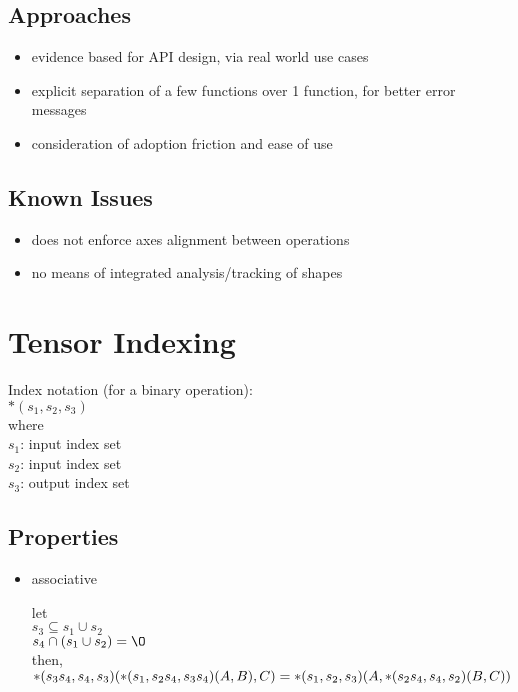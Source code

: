 \documentclass[8pt]{extarticle}
\begin{document}
\begin{multicols*}{2}
  \subsection{Approaches}
  
  \begin{itemize}
  \item evidence based for API design, via real world use cases
  \item explicit separation of a few functions over 1 function, for better error messages
  \item consideration of adoption friction and ease of use
  \end{itemize}

  \vfill\null
  \columnbreak
    
  \subsection{Known Issues}
  \begin{itemize}
  \item does not enforce axes alignment between operations
  \item no means of integrated analysis/tracking of shapes
  \end{itemize}
  
  \vfill\null
  \pagebreak

  \section{Tensor Indexing}

  Index notation (for a binary operation):\\
  $*(s_1,s_2,s_3)$\\
  where\\
  $s_1$: input index set\\
  $s_2$: input index set\\
  $s_3$: output index set

  \subsection{Properties}

  \begin{itemize}
  \item associative
    
    let\\
    $ s_3 \subseteq s_1 \cup s_2$\\
    $s_4 \cap (s_1 \cup s_2) = \O$\\
    then,\\
    $*(s_3 s_4, s_4, s_3)(*(s_1, s_2 s_4, s_3 s_4)(A,B), C)\\
    =*(s_1, s_2, s_3)(A, *(s_2 s_4, s_4, s_2)(B,C))$


\end{itemize}
\end{multicols*}
\end{document}
